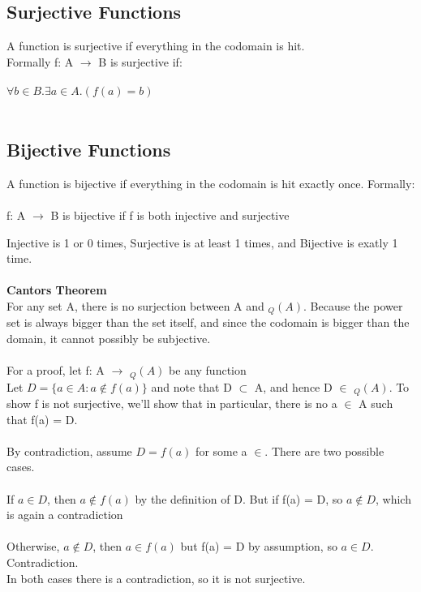 \documentclass{article}
\begin{document}
\subsection{Surjective Functions}
A function is surjective if everything in the codomain is hit. \\
Formally f: A $\rightarrow$ B is surjective if: \\ \\
$\forall b \in B. \exists a \in A. (f(a) = b)$ \\ \\

\subsection{Bijective Functions}
A function is bijective if everything in the codomain is hit exactly once. Formally: \\ \\
f: A $\rightarrow$ B is bijective if f is both injective and surjective

Injective is 1 or 0 times, Surjective is at least 1 times, and Bijective is exatly 1 time. \\ \\

\textbf{Cantors Theorem}\\
For any set A, there is no surjection between A and $_Q(A)$. Because the power set is always bigger than the set itself, and since the codomain is bigger than the domain, it cannot possibly be subjective. \\ \\
For a proof, let f: A $\rightarrow$ $_Q(A)$ be any function\\
Let $D = \{a \in A : a \notin f(a)\}$ and note that D $\subset$ A, and hence D $\in$ $_Q(A)$. To show f is not surjective, we'll show that in particular, there is no a $\in$ A such that f(a) = D. \\ \\

By contradiction, assume $D = f(a)$ for some a $\in$. There are two possible cases. \\ \\
If $a \in D$, then $a \notin f(a)$ by the definition of D. But if f(a) = D, so $a \notin D$, which is again a contradiction \\ \\
Otherwise, $a \notin D$, then $a \in f(a)$ but f(a) = D by assumption, so $a \in D$. Contradiction. \\
In both cases there is a contradiction, so it is not surjective.
\\
\end{document}

